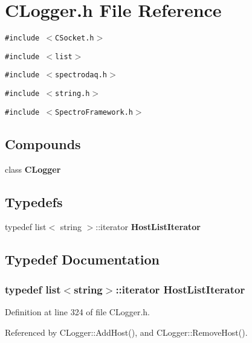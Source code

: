 \section{CLogger.h File Reference}
\label{CLogger_8h}
{\tt \#include $<$CSocket.h$>$}\par
{\tt \#include $<$list$>$}\par
{\tt \#include $<$spectrodaq.h$>$}\par
{\tt \#include $<$string.h$>$}\par
{\tt \#include $<$Spectro\-Framework.h$>$}\par
\subsection*{Compounds}
\begin{CompactItemize}
\item 
class {\bf CLogger}
\end{CompactItemize}
\subsection*{Typedefs}
\begin{CompactItemize}
\item 
typedef list$<$ string $>$::iterator {\bf Host\-List\-Iterator}
\end{CompactItemize}


\subsection{Typedef Documentation}
\subsubsection{\setlength{\rightskip}{0pt plus 5cm}typedef list$<$string$>$::iterator Host\-List\-Iterator}\label{CLogger_8h_a0}




Definition at line 324 of file CLogger.h.

Referenced by CLogger::Add\-Host(), and CLogger::Remove\-Host().
